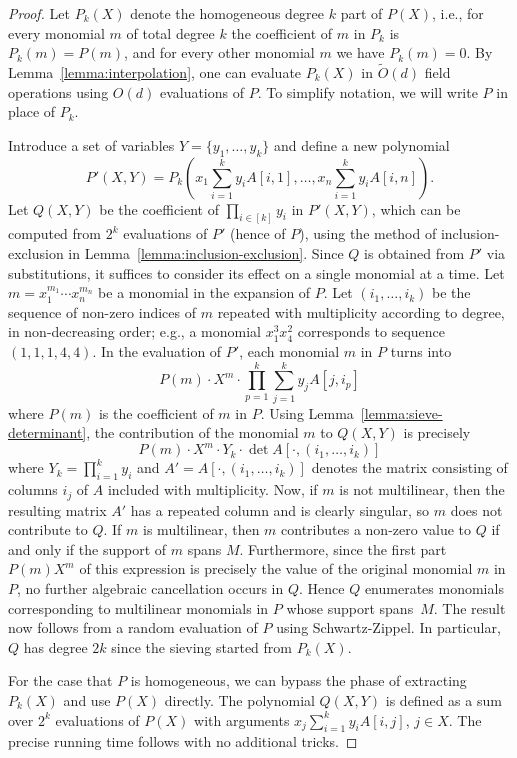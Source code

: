 \documentclass[10pt,a4paper]{article}
\begin{document}
\begin{proof}
  Let $P_k(X)$ denote the homogeneous degree $k$ part of $P(X)$, i.e.,
  for every monomial $m$ of total degree $k$ the coefficient of $m$ in $P_k$
  is $P_k(m)=P(m)$, and for every other monomial $m$ we have $P_k(m)=0$. 
  By Lemma~\ref{lemma:interpolation}, one can evaluate $P_k(X)$ in
  $\tilde{O}(d)$ field operations using $O(d)$ evaluations of $P$.
  To simplify notation, we will write $P$ in place of $P_k$.

  Introduce a set of variables $Y=\{y_1,\ldots,y_k\}$ and define a new polynomial
  \[
    P'(X,Y) = P_k\left(x_1 \sum_{i=1}^k y_i A[i,1], \ldots, x_n \sum_{i=1}^k y_i A[i,n]\right).
  \]
  Let $Q(X,Y)$ be the coefficient of $\prod_{i \in [k]} y_i$ in $P'(X,Y)$, which
  can be computed from $2^k$ evaluations of $P'$ (hence of $P$),
  using the method of inclusion-exclusion in Lemma~\ref{lemma:inclusion-exclusion}. Since $Q$ is
  obtained from $P'$ via substitutions, it suffices to consider its effect on a single monomial at a time.
  Let $m=x_1^{m_1} \cdots x_n^{m_n}$ be a monomial in the expansion of $P$.
  Let $(i_1,\ldots,i_k)$ be the sequence of non-zero indices of $m$
  repeated with multiplicity according to degree, in non-decreasing order; e.g.,
  a monomial $x_1^3x_4^2$ corresponds to sequence $(1,1,1,4,4)$.
  In the evaluation of $P'$, each monomial $m$ in $P$ turns into
  \[
    P(m) \cdot X^m \cdot \prod_{p=1}^k \sum_{j=1}^k y_j A[j,i_p]
  \]
  where $P(m)$ is the coefficient of $m$ in $P$. Using Lemma~\ref{lemma:sieve-determinant},
  the contribution of the monomial $m$ to $Q(X,Y)$ is precisely
  \[
    P(m) \cdot X^m \cdot Y_k \cdot \det A[\cdot,(i_1,\ldots,i_k)]
  \]
  where $Y_k=\prod_{i=1}^k y_i$ and $A'=A[\cdot,(i_1,\ldots,i_k)]$ denotes the
  matrix consisting of columns $i_j$ of $A$ included with multiplicity. 
  Now, if $m$ is not multilinear, then the resulting matrix $A'$ has a repeated column
  and is clearly singular, so $m$ does not contribute to $Q$. If $m$ is multilinear,
  then $m$ contributes a non-zero value to $Q$ if and only if the
  support of $m$ spans $M$. Furthermore, since the first part
  $P(m) X^m$ of this expression is precisely the value of the original
  monomial $m$ in $P$, no further algebraic cancellation occurs in $Q$.
  Hence $Q$ enumerates monomials corresponding to multilinear
  monomials in $P$ whose support spans~$M$. The result now follows
  from a random evaluation of $P$ using Schwartz-Zippel. In particular, 
  $Q$ has degree $2k$ since the sieving started from $P_k(X)$.

  For the case that $P$ is homogeneous, we can bypass the phase of
  extracting $P_k(X)$ and use $P(X)$ directly. The polynomial $Q(X,Y)$
  is defined as a sum over $2^k$ evaluations of $P(X)$
  with arguments $x_j \sum_{i=1}^k y_i A[i,j]$, $j \in X$. 
  The precise running time follows with no additional tricks.   
\end{proof}
\end{document}
